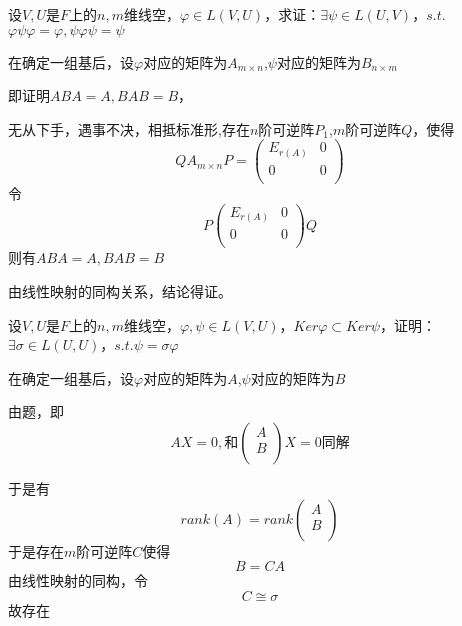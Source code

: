 \documentclass[lang=cn,10pt]{elegantbook}
\begin{document}
\begin{example}
	设$V,U$是$F$上的$n,m$维线空$，\varphi\in L(V,U)$，求证：$\exists\psi\in L(U,V)$，$s.t.$ $\varphi\psi\varphi=\varphi,\psi\varphi\psi=\psi$
\end{example}
\begin{solution}
	
	在确定一组基后，设$\varphi$对应的矩阵为$A_{m\times n}$,$ \psi$对应的矩阵为$B_{n\times m} $
	
	即证明$ABA=A,BAB=B$，
	
	无从下手，遇事不决，相抵标准形,存在$n$阶可逆阵$P_{1}$,$m$阶可逆阵$Q$，使得
	\begin{equation*}
		QA_{m\times n}P=\left(\begin{matrix}E_{r(A)}&0\\0&0\\\end{matrix}\right)
	\end{equation*}
	令
	\begin{equation*}
		P\left( \begin{matrix}
			E_{r\left( A \right)}&		0\\
			0&		0\\
		\end{matrix} \right) Q
	\end{equation*}
	则有$ABA=A,BAB=B$
	
	由线性映射的同构关系，结论得证。
\end{solution}
\begin{example}
	设$V,U$是$F$上的$n,m$维线空$，\varphi,\psi\in L(V,U)$，$Ker\varphi\subset Ker\psi$，证明：$\exists\sigma\in L(U,U)$，$s.t. \psi=\sigma\varphi$
\end{example}
\begin{solution}
	
	在确定一组基后，设$\varphi$对应的矩阵为$A$,$ \psi$对应的矩阵为$B$
	
	由题，即
	\begin{equation*}
		AX=0,\text{和}\left( \begin{array}{c}
			A\\
			B\\
		\end{array} \right) X=0\text{同解}
	\end{equation*}
	
	于是有
	\begin{equation*}
		rank(A)=rank\left( \begin{array}{c}
			A\\
			B\\
		\end{array} \right)
	\end{equation*}
	于是存在$m$阶可逆阵$C$使得
	\begin{equation*}
		B=CA
	\end{equation*}
	由线性映射的同构，令
	\begin{equation*}
		C\cong \sigma 
	\end{equation*}
	故存在
\end{solution}
\end{document}
